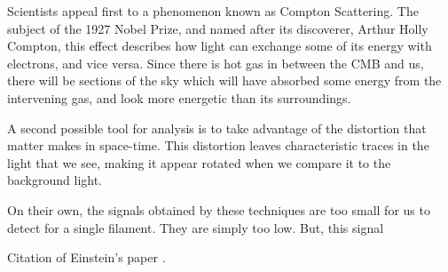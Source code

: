 \documentclass{nature}
\begin{document}
Scientists appeal first to a phenomenon known as Compton Scattering. The subject of the 1927 Nobel Prize, and named after its discoverer, Arthur Holly Compton, this effect describes how light can exchange some of its energy with electrons, and vice versa. Since there is hot gas in between the CMB and us, there will be sections of the sky which will have absorbed some energy from the intervening gas, and look more energetic than its surroundings. 

A second possible tool for analysis is to take advantage of the distortion that matter makes in space-time. This distortion leaves characteristic traces in the light that we see, making it appear rotated when we compare it to the background light. 

On their own, the signals obtained by these techniques are too small for us to detect for a single filament. They are simply too low. But, this signal 



Citation of Einstein's paper \cite{Einstein}.



\end{document}
